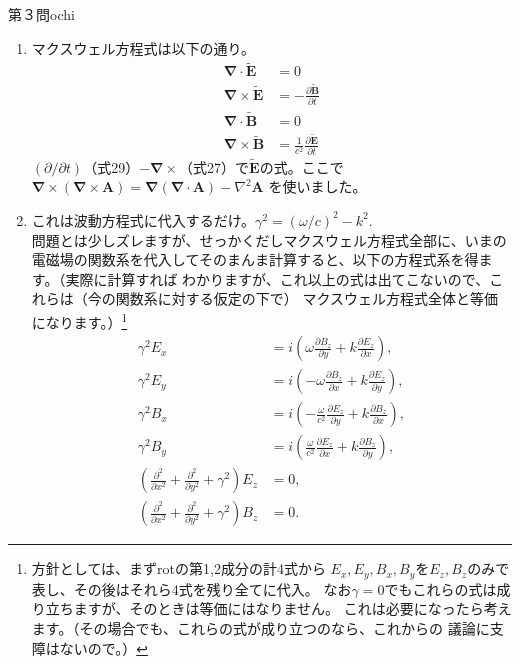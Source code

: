 \begin{answer}{第３問}{ochi}
\begin{enumerate}
\item
  マクスウェル方程式は以下の通り。
  \begin{align}
    \mathbf{\nabla}\cdot \mathbf{\tilde{E}}&=0\\
    \mathbf{\nabla}\times \mathbf{\tilde{E}}&=-\frac{\partial \mathbf{\tilde{B}}}{\partial t}\\
    \mathbf{\nabla}\cdot \mathbf{\tilde{B}}&=0\\
    \mathbf{\nabla}\times \mathbf{\tilde{B}}&=\frac{1}{c^2}\frac{\partial \mathbf{\tilde{E}}}{\partial t}
  \end{align}
  $(\partial/\partial t)$（式29）$-\mathbf{\nabla}\times$（式27）で$\mathbf{\tilde{E}}$の式。ここで
  $\mathbf{\nabla}\times(\mathbf{\nabla}\times \mathbf{A})=\mathbf{\nabla}
  (\mathbf{\nabla}\cdot \mathbf{A})-\nabla^2 \mathbf{A}$
  を使いました。

\item
  これは波動方程式に代入するだけ。$\gamma^2=(\omega/c)^2-k^2$.\\

  問題とは少しズレますが、せっかくだしマクスウェル方程式全部に、いまの
  電磁場の関数系を代入してそのまんま計算すると、以下の方程式系を得ます。（実際に計算すれば
  わかりますが、これ以上の式は出てこないので、これらは（今の関数系に対する仮定の下で）
  マクスウェル方程式全体と等価になります。）\footnote{方針としては、まずrotの第1,2成分の計4式から
  $E_x,E_y,B_x,B_y$を$E_z,B_z$のみで表し、その後はそれら4式を残り全てに代入。
  なお$\gamma=0$でもこれらの式は成り立ちますが、そのときは等価にはなりません。
  これは必要になったら考えます。（その場合でも、これらの式が成り立つのなら、これからの
  議論に支障はないので。）}
  \begin{align}
    \gamma^2 E_x&=
      i(\omega \frac{\partial B_z}{\partial y}+k\frac{\partial E_z}{\partial x}),\\
    \gamma^2 E_y&=
      i(-\omega \frac{\partial B_z}{\partial x}+k\frac{\partial E_z}{\partial y}),\\
    \gamma ^2B_x&=
      i(-\frac{\omega}{c^2} \frac{\partial E_z}{\partial y}+k\frac{\partial B_z}{\partial x}),\\
    \gamma ^2B_y&=
      i(\frac{\omega}{c^2}\frac{\partial E_z}{\partial x}+k\frac{\partial B_z}{\partial y}),\\
    \left( \frac{\partial^2}{\partial x^2}+\frac{\partial^2}{\partial y^2}+\gamma^2 \right)E_z&=0,\\
    \left( \frac{\partial^2}{\partial x^2}+\frac{\partial^2}{\partial y^2}+\gamma^2 \right)B_z&=0.
  \end{align}


\end{enumerate}
\end{answer}
